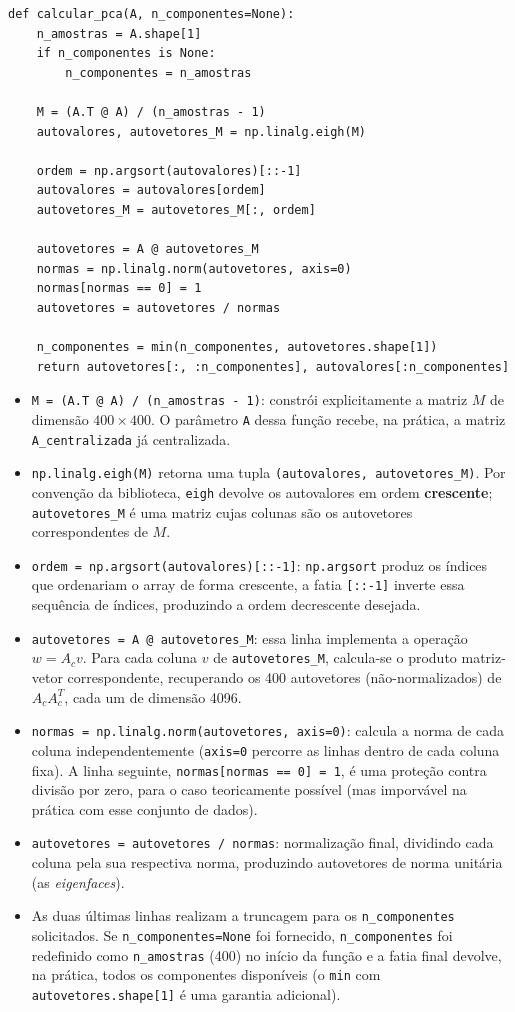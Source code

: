 \documentclass[12pt,a4paper]{article}
\begin{document}
\begin{lstlisting}
def calcular_pca(A, n_componentes=None):
    n_amostras = A.shape[1]
    if n_componentes is None:
        n_componentes = n_amostras

    M = (A.T @ A) / (n_amostras - 1)
    autovalores, autovetores_M = np.linalg.eigh(M)

    ordem = np.argsort(autovalores)[::-1]
    autovalores = autovalores[ordem]
    autovetores_M = autovetores_M[:, ordem]

    autovetores = A @ autovetores_M
    normas = np.linalg.norm(autovetores, axis=0)
    normas[normas == 0] = 1
    autovetores = autovetores / normas

    n_componentes = min(n_componentes, autovetores.shape[1])
    return autovetores[:, :n_componentes], autovalores[:n_componentes]
\end{lstlisting}

\begin{itemize}
  \item \texttt{M = (A.T @ A) / (n\_amostras - 1)}: constrói explicitamente a matriz $M$ de dimensão $400\times400$. O parâmetro \texttt{A} dessa função
  recebe, na prática, a matriz \texttt{A\_centralizada} já centralizada.
  \item \texttt{np.linalg.eigh(M)} retorna uma tupla \texttt{(autovalores, autovetores\_M)}. Por convenção
  da biblioteca, \texttt{eigh} devolve os autovalores em ordem \textbf{crescente}; \texttt{autovetores\_M}
  é uma matriz cujas colunas são os autovetores correspondentes de $M$.
  \item \texttt{ordem = np.argsort(autovalores)[::-1]}: \texttt{np.argsort} produz os índices que
  ordenariam o array de forma crescente, a fatia \texttt{[::-1]} inverte essa sequência de
  índices, produzindo a ordem decrescente desejada.
  \item \texttt{autovetores = A @ autovetores\_M}: essa linha implementa a operação
  $w=A_cv$. Para cada coluna $v$ de
  \texttt{autovetores\_M}, calcula-se o produto matriz-vetor correspondente, recuperando os
  400 autovetores (não-normalizados) de $A_cA_c^T$, cada um de dimensão 4096.
  \item \texttt{normas = np.linalg.norm(autovetores, axis=0)}: calcula a norma de cada
  coluna independentemente (\texttt{axis=0} percorre as linhas dentro de cada coluna fixa).
  A linha seguinte, \texttt{normas[normas == 0] = 1}, é uma proteção contra
  divisão por zero, para o caso teoricamente possível (mas imporvável na prática com esse conjunto de dados).
  \item \texttt{autovetores = autovetores / normas}: normalização final, dividindo cada coluna
  pela sua respectiva norma, produzindo autovetores de
  norma unitária (as \textit{eigenfaces}).
  \item As duas últimas linhas realizam a truncagem para os \texttt{n\_componentes} solicitados. Se
  \texttt{n\_componentes=None} foi fornecido, \texttt{n\_componentes} foi redefinido como
  \texttt{n\_amostras} (400) no início da função e a fatia final devolve, na prática, todos
  os componentes disponíveis (o \texttt{min} com \texttt{autovetores.shape[1]} é uma garantia
  adicional).
\end{itemize}
\end{document}
